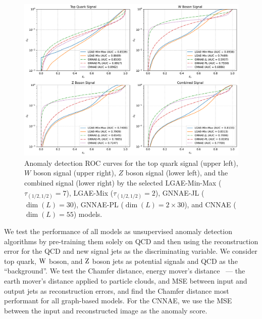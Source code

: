 \begin{figure}[ht!]
    \centering
    \includegraphics[width=\linewidth]{figures/06-ML4Jets/lgae/anomaly/roc_curves-cnnae.pdf}
    \caption[Anomaly detection ROC curves for the LGAE, GNNAE, and CNNAE models.]{
        Anomaly detection ROC curves for
        the top quark signal (upper left),
        $W$ boson signal (upper right),
        $Z$ boson signal (lower left),
        and the combined signal (lower right)
        by the selected
        LGAE-Min-Max ($\tau_{(1/2, 1/2)} = 7$),
        LGAE-Mix ($\tau_{(1/2, 1/2)}=2$),
        GNNAE-JL ($\dim(L) = 30$),
        GNNAE-PL ($\dim(L) = 2 \times 30$),
        and CNNAE ($\dim(L) = 55$)
        models.
    }
    \label{fig:06_lgae_roc-each}
\end{figure}

We test the performance of all models as unsupervised anomaly detection algorithms by pre-training them solely on QCD and then using the reconstruction error for the QCD and new signal jets as the discriminating variable.
We consider top quark, $\textrm{W}$ boson, and $\textrm{Z}$ boson jets as potential signals and QCD as the ``background''.
We test the Chamfer distance, energy mover's distance~\cite{Komiske:2019fks} --- the earth mover's distance applied to particle clouds, and MSE between input and output jets as reconstruction errors, and find the Chamfer distance most performant for all graph-based models. 
For the CNNAE, we use the MSE between the input and reconstructed image as the anomaly score. 

